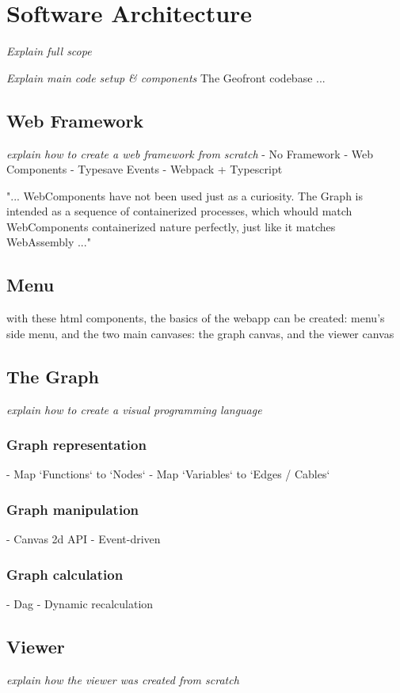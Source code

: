 \chapter{Software Architecture}
\emph{Explain full scope}


\emph{Explain main code setup \& components}
The Geofront codebase ...

\section{Web Framework}
\emph{explain how to create a web framework from scratch}
- No Framework
- Web Components
- Typesave Events
- Webpack + Typescript

"...
WebComponents have not been used just as a curiosity. 
The Graph is intended as a sequence of containerized processes, which whould match WebComponents containerized nature perfectly, just like it matches WebAssembly
..."


\section{Menu}
with these html components, the basics of the webapp can be created: menu's side menu, and the two main canvases: the graph canvas, and the viewer canvas 

\section{The Graph}
\emph{explain how to create a visual programming language}
\subsection*{Graph representation}
  - Map `Functions` to `Nodes` 
  - Map `Variables` to `Edges / Cables`
\subsection*{Graph manipulation}
  - Canvas 2d API
  - Event-driven
\subsection*{Graph calculation}
  - Dag
  - Dynamic recalculation 

\section{Viewer}
\emph{explain how the viewer was created from scratch}

